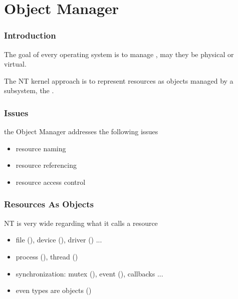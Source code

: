 %
%

\section{Object Manager}


\begin{frame}
  \frametitle{Introduction}

 The goal of every operating system is to manage , may
 they be physical or virtual.

  \-

 The NT kernel approach is to represent resources as objects managed by a
 subsystem, the .

\end{frame}


\begin{frame}
  \frametitle{Issues}

  the Object Manager addresses the following issues

  \begin{itemize}
    \item
      resource naming
    \item
      resource referencing
    \item
      resource access control
 \end{itemize}
\end{frame}


\begin{frame}
  \frametitle{Resources As Objects}

  NT is very wide regarding what it calls a resource

  \begin{itemize}
    \item
      file (), device (), driver () ...
    \item
      process (), thread ()
    \item
      synchronization: mutex (), event (), callbacks ...
    \item
      even types are objects ()
  \end{itemize}

\end{frame}


